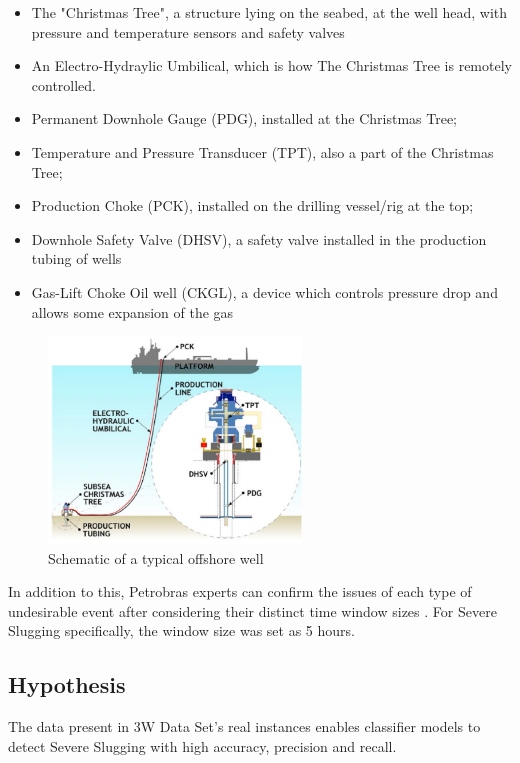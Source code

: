 \documentclass{article}
\begin{document}
\begin{itemize}
\item The "Christmas Tree", a structure lying on the seabed, at the well head, with pressure and temperature sensors and safety valves
\item An Electro-Hydraylic Umbilical, which is how The Christmas Tree is remotely controlled.
\item Permanent Downhole Gauge (PDG), installed at the Christmas Tree;
\item Temperature and Pressure Transducer (TPT), also a part of the Christmas Tree;
\item Production Choke (PCK), installed on the drilling vessel/rig at the top;
\item Downhole Safety Valve (DHSV), a safety valve installed in the production tubing of wells
\item Gas-Lift Choke Oil well (CKGL), a device which controls pressure drop and allows some expansion of the gas \parencite{petrowiki_2013}
\end{itemize}


\begin{figure}
\centering
\includegraphics[width=0.6\textwidth]{offshore_well.png}
\caption{\label{fig:offshore_well}Schematic of a typical offshore well}
\end{figure}

In addition to this, Petrobras experts can confirm the issues of each type of undesirable event after considering their distinct time window sizes \parencite{revvargas2019}. For Severe Slugging specifically, the window size was set as 5 hours.


\subsection{Hypothesis}
The data present in 3W Data Set's real instances enables classifier models to detect Severe Slugging with high accuracy, precision and recall.
\end{document}
